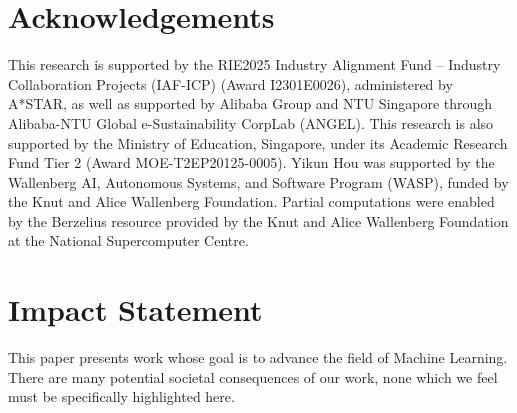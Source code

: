\documentclass{article}
\theoremstyle{plain}
\theoremstyle{definition}
\theoremstyle{remark}
\begin{document}



\clearpage
\section*{Acknowledgements}
This research is supported by the RIE2025 Industry Alignment Fund –
Industry Collaboration Projects (IAF-ICP) (Award I2301E0026), administered by A*STAR, as well
as supported by Alibaba Group and NTU Singapore through Alibaba-NTU Global e-Sustainability
CorpLab (ANGEL). 
This research is also supported by the Ministry of Education, Singapore, under its Academic Research Fund Tier 2 (Award MOE-T2EP20125-0005).
Yikun Hou was supported by the Wallenberg AI, Autonomous Systems, and Software Program (WASP), funded by the Knut and Alice Wallenberg Foundation. Partial computations were enabled by the Berzelius resource provided by the Knut and Alice Wallenberg Foundation at the National Supercomputer Centre.


\section*{Impact Statement}

This paper presents work whose goal is to advance the field of Machine Learning. There are many potential societal consequences of our work, none which we feel must be specifically highlighted here.





\newpage
\appendix
\onecolumn

\end{document}
